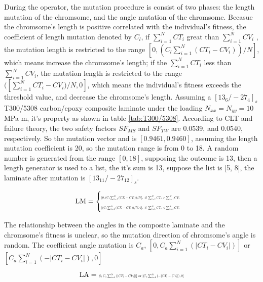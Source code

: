 During the operator, the mutation procedure is consist of two phases: the length
mutation of the chromsome, and the angle mutation of the chromsome.  Becasue the
chromsome's length is positive correlated with the individual's fitness, the
coefficient of length mutation denoted by $C_l$, if $\sum_{i=1}^{N}{CT_i}$ great
than $\sum_{i=1}^{N}{CV_i}$ , the mutation length is restricted to the range
$[0,(C_l \sum_{i=1}^{N}{(CT_i-CV_i)})/N]$, which means increase the chromsome's
length; if the $\sum_{i=1}^{N}{CT_i}$ less than $\sum_{i=1}^{N}{CV_i}$, the
mutation length is restricted to the range $([\sum_{i=1}^{N}{CT_i-CV_i})/N,0]$,
which means the individual's fitness exceeds the threshold value, and decrease
the chromsome's length.  Assuming a $[13_6/-27_4]_s$ T300/5308 carbon/epoxy composite
laminate under the loading $N_{xx} = N_{yy} = 10$ MPa m, it's property as shown
in table \ref{tab:T300/5308}. According to CLT and
failure theory, the two safety factors $SF_{MS}$ and $SF_{TW}$ are  0.0539, and
0.0540, respectively. So the mutation vector and is $[0.9461,0.9460]$, assuming
the length mutation coefficient is 20, so the mutation range is from 0 to 18. A
random number is generated from the range $[0, 18]$, supposing the outcome is
13, then a length generator is used to a list, the it's sum is 13, suppose the
list is [5, 8], the laminate after mutation is $[13_{11}/-27_{12}]_s$.

\begin{align}
	\text{LM} = 
	\begin{cases}
		\resizebox{.32\textwidth}{!}{$[0,(C_l \sum_{i=1}^{N}{(CT_i-CV_i)})/N], \text{ if }  \sum_{i=1}^{N}{CT_i} > 
		\sum_{i=1}^{N}{CV_i}$}\\
		\resizebox{.32\textwidth}{!}{$[(C_l \sum_{i=1}^{N}{(CT_i-CV_i)})/N,0], \text{ if }  \sum_{i=1}^{N}{CT_i} < 
		\sum_{i=1}^{N}{CV_i}$}\\
	\end{cases}
\end{align}

The relationship between the angles in the composite laminate and the
chromsome's fitness is unclear, so the mutation direction of chromsome's angle
is random. The coefficient angle mutation is $C_a$, $[0,C_a
\sum_{i=1}^{N}{(|CT_i-CV_i|)}]$ or $[C_a \sum_{i=1}^{N}{(-|CT_i-CV_i|)},0]$

\begin{equation}
	\text{LA} =  
	\resizebox{0.35\textwidth}{!}{$[0,C_a
	\sum_{i=1}^{N}{(|CT_i-CV_i|)}] \text{ or } [C_a \sum_{i=1}^{N}{(-|CT_i-CV_i|)},0]$}
\end{equation}
